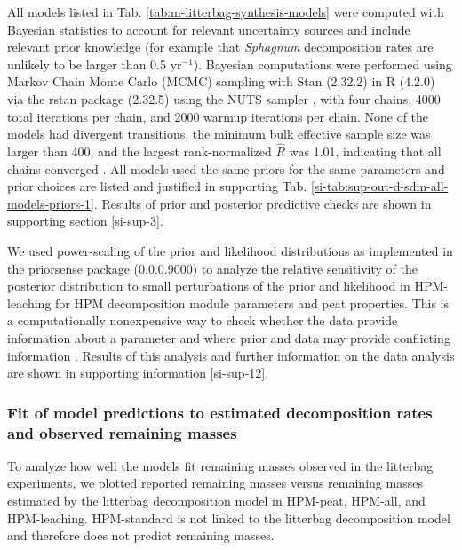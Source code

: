 \documentclass[esd, manuscript]{copernicus}
\begin{document}
All models listed in Tab. \ref{tab:m-litterbag-synthesis-models} were computed with Bayesian statistics to account for relevant uncertainty sources and include relevant prior knowledge (for example that \emph{Sphagnum} decomposition rates are unlikely to be larger than 0.5 yr\(^{-1}\)). Bayesian computations were performed using Markov Chain Monte Carlo (MCMC) sampling with Stan (2.32.2) \citep{StanDevelopmentTeam.2021a} in R (4.2.0) \citep{RCoreTeam.2022} via the rstan package (2.32.5) \citep{StanDevelopmentTeam.2021b} using the NUTS sampler \citep{Hoffman.2014}, with four chains, 4000 total iterations per chain, and 2000 warmup iterations per chain. None of the models had divergent transitions, the minimum bulk effective sample size was larger than 400, and the largest rank-normalized \(\hat{R}\) was 1.01, indicating that all chains converged \citep{Vehtari.2021}. All models used the same priors for the same parameters and prior choices are listed and justified in supporting Tab. \ref{si-tab:sup-out-d-sdm-all-models-priors-1}. Results of prior and posterior predictive checks are shown in supporting section \ref{si-sup-3}.

We used power-scaling of the prior and likelihood distributions as implemented in the priorsense package (0.0.0.9000) \citep{Kallioinen.2024} to analyze the relative sensitivity of the posterior distribution to small perturbations of the prior and likelihood in HPM-leaching for HPM decomposition module parameters and peat properties. This is a computationally nonexpensive way to check whether the data provide information about a parameter and where prior and data may provide conflicting information \citep{Kallioinen.2024}. Results of this analysis and further information on the data analysis are shown in supporting information \ref{si-sup-12}.

\hypertarget{sdm-003-methods-9}{%
\subsubsection{Fit of model predictions to estimated decomposition rates and observed remaining masses}\label{sdm-003-methods-9}}

To analyze how well the models fit remaining masses observed in the litterbag experiments, we plotted reported remaining masses versus remaining masses estimated by the litterbag decomposition model in HPM-peat, HPM-all, and HPM-leaching. HPM-standard is not linked to the litterbag decomposition model and therefore does not predict remaining masses.
\end{document}
